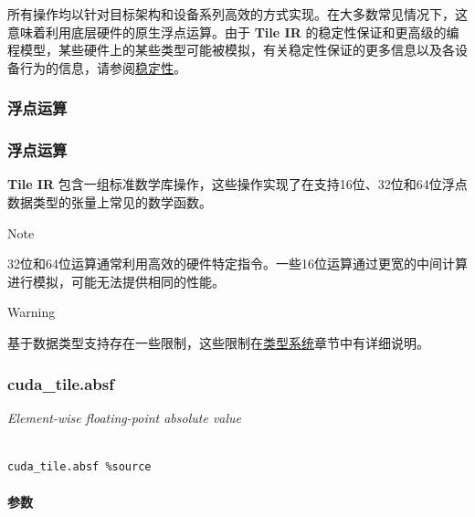 \documentclass{article}
\begin{document}
所有操作均以针对目标架构和设备系列高效的方式实现。在大多数常见情况下，这意味着利用底层硬件的原生浮点运算。由于 \textbf{Tile IR} 的稳定性保证和更高级的编程模型，某些硬件上的某些类型可能被模拟，有关稳定性保证的更多信息以及各设备行为的信息，请参阅\href{https://docs.nvidia.com/cuda/tile-ir/latest/sections/stability.html#section-stability}{稳定性}。


\subsubsection{浮点运算}



\subsubsection{浮点运算}


\textbf{Tile IR} 包含一组标准数学库操作，这些操作实现了在支持16位、32位和64位浮点数据类型的张量上常见的数学函数。



Note




32位和64位运算通常利用高效的硬件特定指令。一些16位运算通过更宽的中间计算进行模拟，可能无法提供相同的性能。





Warning




基于数据类型支持存在一些限制，这些限制在\href{https://docs.nvidia.com/cuda/tile-ir/latest/sections/types.html#section-types}{类型系统}章节中有详细说明。





\subsubsection{cuda\_tile.absf}


\textit{Element-wise floating-point absolute value}




\begin{lstlisting}

cuda_tile.absf %source

\end{lstlisting}



\paragraph{参数}
\end{document}
